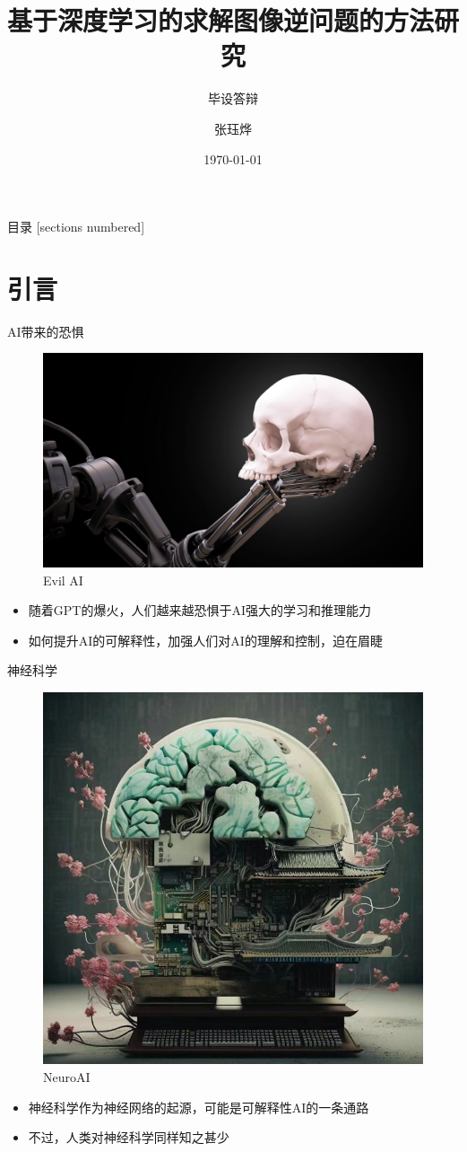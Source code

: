 \documentclass[10pt]{beamer}
\title{基于深度学习的求解图像逆问题的方法研究}
\subtitle{毕设答辩}
\date{\today}
\author{张珏烨}
\institute{武汉理工大学计算机与人工智能学院}
\begin{document}
\maketitle

\begin{frame}{目录}
  [sections numbered]
  \tableofcontents[hideallsubsections]
\end{frame}

\section{引言}

\begin{frame}[fragile]{AI带来的恐惧}
  \begin{figure}[thbp!]
    \centering
    \includegraphics[width=0.8\linewidth]{imgs/ai.jpg}
    \caption{Evil AI}
    \label{fig:evil-ai}
    \end{figure}
  \begin{itemize}
    \item 随着GPT的爆火，人们越来越恐惧于AI强大的学习和推理能力
    \item 如何提升AI的可解释性，加强人们对AI的理解和控制，迫在眉睫
  \end{itemize}
\end{frame}

\begin{frame}[fragile]{神经科学}
  \begin{figure}[thbp!]
    \centering
    \includegraphics[width=0.5\linewidth]{imgs/CCN.jpg}
    \caption{NeuroAI}
    \label{fig:NeuroAI}
    \end{figure}
  
  \begin{itemize}
    \item 神经科学作为神经网络的起源，可能是可解释性AI的一条通路
    \item 不过，人类对神经科学同样知之甚少
  \end{itemize}
\end{frame}
\end{document}
